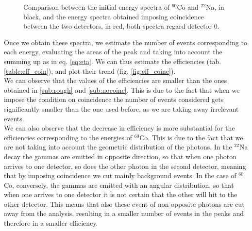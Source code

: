 \begin{figure}[H]
\begin{minipage}[]{0.5\linewidth}
	\end{minipage}
	\caption{Comparison between the initial energy spectra of $^{60}$Co and $^{22}$Na, in black, and the energy spectra obtained imposing coincidence between the two detectors, in red, both spectra regard detector 0.}
    \label{fig:coinc_spectra}
	\end{figure}

Once we obtain these spectra, we estimate the number of events corresponding to each energy, evaluating the areas of the peak and taking into account the summing up as in eq. \ref{eq:eta}. We can thus estimate the efficiencies (tab.\ref{table:eff_coin}), and plot their trend (fig. \ref{fig:eff_coinc}). \\

We can observe that the values of the efficiencies are smaller than the ones obtained in \ref{sub:rough} and \ref{sub:nocoinc}. This is due to the fact that when we impose the condition on coincidence the number of events considered gets significantly smaller than the one used before, as we are taking away irrelevant events. \\
We can also observe that the decrease in efficiency is more substantial for the efficiencies corresponding to the energies of $^{60}$Co. This is due to the fact that we are not taking into account the geometric distribution of the photons. In the $^{22}$Na decay the gammas are emitted in opposite direction, so that when one photon arrives to one detector, so does the other photon in the second detector, meaning that by imposing coincidence we cut mainly background events. In the case of $^{60}$Co, conversely, the gammas are emitted with an angular distribution, so that when one arrives to one detector it is not certain that the other will hit to the other detector. This means that also these event of non-opposite photons are cut away from the analysis, resulting in a smaller number of events in the peaks and therefore in a smaller efficiency.

